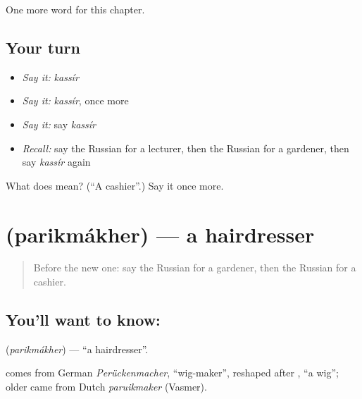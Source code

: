\begin{grammarlens}[title={What you've built}]
One more word for this chapter.
\end{grammarlens}

\subsection*{Your turn}
\begin{itemize}
\raggedright
  \item \emph{Say it:} \emph{kassír}
  \item \emph{Say it:} \emph{kassír}, once more
  \item \emph{Say it:} say \emph{kassír}
  \item \emph{Recall:} say the Russian for a lecturer, then the Russian for a gardener, then say \emph{kassír} again
\end{itemize}

\begin{tcolorbox}[breakable,colback=teal!4,colframe=teal!35!black,title={Before you move on}]
What does  mean? (\textquotedblleft{}A cashier\textquotedblright{}.) Say it once more.
\end{tcolorbox}
\section[\texorpdfstring{\ru{парикмахер} (parikmákher)}{парикмахер (parikmákher)}]{ (parikmákher) — a hairdresser}

\label{lesson:RU-C230-parikmakher}



\begin{quote}
Before the new one: say the Russian for a gardener, then the Russian for a cashier.
\end{quote}

\subsection*{You'll want to know: }
\textbf{} (\emph{parikmákher}) — \textquotedblleft{}a hairdresser\textquotedblright{}.

\begin{cousinweb}
\textbf{} comes from German \emph{Perückenmacher}, \textquotedblleft{}wig-maker\textquotedblright{}, reshaped after \emph{}, \textquotedblleft{}a wig\textquotedblright{}; older \emph{} came from Dutch \emph{paruikmaker} (Vasmer).
\end{cousinweb}


